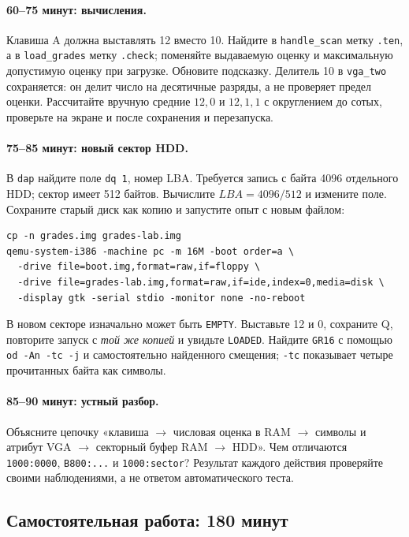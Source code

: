 \paragraph{60--75 минут: вычисления.}
Клавиша A должна выставлять 12 вместо 10. Найдите в
\texttt{handle\_scan} метку \texttt{.ten}, а в
\texttt{load\_grades} метку \texttt{.check}; поменяйте выдаваемую
оценку и максимальную допустимую оценку при загрузке. Обновите
подсказку. Делитель 10 в \texttt{vga\_two} сохраняется: он делит
число на десятичные разряды, а не проверяет предел оценки.
Рассчитайте вручную средние $12,0$ и $12,1,1$ с округлением до
сотых, проверьте на экране и после сохранения и перезапуска.

\paragraph{75--85 минут: новый сектор HDD.}
В \texttt{dap} найдите поле \texttt{dq 1}, номер LBA. Требуется
запись с байта 4096 отдельного HDD; сектор имеет 512 байтов.
Вычислите $LBA=4096/512$ и измените поле. Сохраните старый диск
как копию и запустите опыт с новым файлом:
\begin{lstlisting}[basicstyle=\ttfamily\footnotesize]
cp -n grades.img grades-lab.img
qemu-system-i386 -machine pc -m 16M -boot order=a \
  -drive file=boot.img,format=raw,if=floppy \
  -drive file=grades-lab.img,format=raw,if=ide,index=0,media=disk \
  -display gtk -serial stdio -monitor none -no-reboot
\end{lstlisting}
В новом секторе изначально может быть \texttt{EMPTY}. Выставьте
12 и 0, сохраните Q, повторите запуск с \emph{той же копией} и
увидьте \texttt{LOADED}. Найдите \texttt{GR16} с помощью
\texttt{od -An -tc -j} и самостоятельно найденного смещения;
\texttt{-tc} показывает четыре прочитанных байта как символы.

\paragraph{85--90 минут: устный разбор.}
Объясните цепочку «клавиша $\to$ числовая оценка в RAM $\to$
символы и атрибут VGA $\to$ секторный буфер RAM $\to$ HDD».
Чем отличаются \texttt{1000:0000}, \texttt{B800:...} и
\texttt{1000:sector}? Результат каждого действия проверяйте
своими наблюдениями, а не ответом автоматического теста.

\subsection*{Самостоятельная работа: 180 минут}
